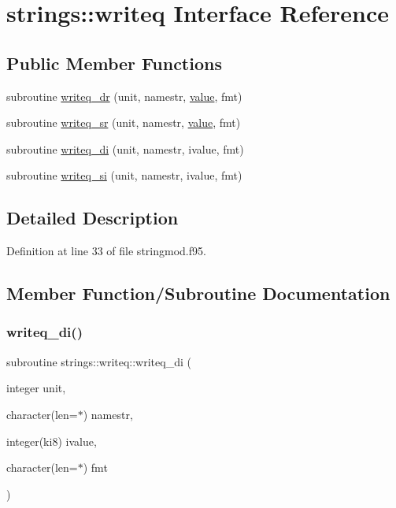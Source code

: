\hypertarget{interfacestrings_1_1writeq}{}\section{strings\+:\+:writeq Interface Reference}
\label{interfacestrings_1_1writeq}
\subsection*{Public Member Functions}
\begin{DoxyCompactItemize}
\item 
subroutine \hyperlink{interfacestrings_1_1writeq_a141904a2ffb98125035f6ce0944ffd4c}{writeq\+\_\+dr} (unit, namestr, \hyperlink{interfacestrings_1_1value}{value}, fmt)
\item 
subroutine \hyperlink{interfacestrings_1_1writeq_a2c9743fd678c7eb3387f7acae35de200}{writeq\+\_\+sr} (unit, namestr, \hyperlink{interfacestrings_1_1value}{value}, fmt)
\item 
subroutine \hyperlink{interfacestrings_1_1writeq_a19d50dea30fcb08479b3ec0626c58f69}{writeq\+\_\+di} (unit, namestr, ivalue, fmt)
\item 
subroutine \hyperlink{interfacestrings_1_1writeq_af7f414c54607f15965a0e67c7702aa9c}{writeq\+\_\+si} (unit, namestr, ivalue, fmt)
\end{DoxyCompactItemize}


\subsection{Detailed Description}


Definition at line 33 of file stringmod.\+f95.



\subsection{Member Function/\+Subroutine Documentation}
\mbox{\label{interfacestrings_1_1writeq_a19d50dea30fcb08479b3ec0626c58f69}} 
\subsubsection{\texorpdfstring{writeq\+\_\+di()}{writeq\_di()}}
{\footnotesize\ttfamily subroutine strings\+::writeq\+::writeq\+\_\+di (\begin{DoxyParamCaption}\item[{integer}]{unit,  }\item[{character(len=$\ast$)}]{namestr,  }\item[{integer(ki8)}]{ivalue,  }\item[{character(len=$\ast$)}]{fmt }\end{DoxyParamCaption})}



